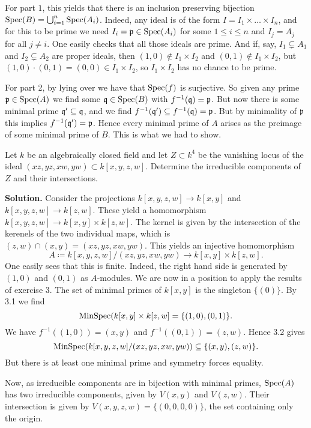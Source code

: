 \documentclass[a4paper,11pt]{article}
\begin{document}
For part $1$, this yields that there is an inclusion preserving bijection
$\operatorname{Spec}(B) = \bigcup_{i=1}^n \operatorname{Spec}(A_i)$. Indeed, any ideal is of the 
form $I = I_1 \times \dots \times I_n$, and for this to be prime we 
need $I_i = \mathfrak{p} \in \operatorname{Spec}(A_i)$ for some $1 \leq i \leq n$ and $I_j = A_j$ for
all $j \neq i$. One easily checks that  all those ideals are prime. And if,
say, $I_1 \subsetneq A_1$ and $I_2 \subsetneq A_2$ are proper ideals, then
$(1,0) \not \in I_1 \times I_2$ and $(0,1) \not \in I_1 \times I_2$, but $(1,0)
\cdot (0,1) = (0,0) \in I_1 \times I_2$, so $I_1 \times I_2$ has no chance to
be prime.

For part 2, by lying over we have that $\operatorname{Spec}(f)$ is surjective. So given 
any prime $\mathfrak{p} \in \operatorname{Spec}(A)$ we find some $\mathfrak{q} \in \operatorname{Spec}(B)$ with
$f^{-1}(\mathfrak{q}) = \mathfrak{p}$. But now there is some minimal prime $\mathfrak{q}' \subseteq \mathfrak{q}$,
and we find $f^{-1}(\mathfrak{q}') \subseteq f^{-1}(\mathfrak{q}) = \mathfrak{p}$. But by minimality of 
$\mathfrak{p}$ this implies $f^{-1}(\mathfrak{q}') = \mathfrak{p}$. Hence every minimal prime
of $A$ arises as the preimage of some minimal prime of $B$. This is what we 
had to show. 

Let $k$ be an algebraically closed field and let $Z \subset k^4$ be
the vanishing locus of the ideal
$(xz,yz,xw,yw) \subset k[x,y,z,w]$. Determine the irreducible components
of $Z$ and their intersections. 

\textbf{Solution.} Consider the projections $k[x,y,z,w] \to k[x,y]$ 
and $k[x,y,z,w] \to k[z,w]$. These yield a homomorphism $k[x,y,z,w] \to
k[x,y] \times k[z,w]$. The kernel is given by the intersection of the kerenels
of the two individual maps, which is $(z,w) \cap (x,y) = (xz,yz, xw, yw)$. 
This yields an injective homomorphism
$$A \coloneqq k[x,y,z,w]/(xz,yz,xw,yw) \to k[x,y] \times k[z,w].$$
One easily sees that this is finite. Indeed, the right hand side is generated
by $(1,0)$ and $(0,1)$ as $A$-modules. 
We are now in a position to apply the results of exercise 3. The set of minimal
primes of $k[x,y]$ is the singleton $\{(0)\}$. By 3.1 we find
\begin{equation*}
    \operatorname{MinSpec}(k[x,y] \times k[z,w] = \{(1,0), (0,1)\}.
\end{equation*}
We have $f^{-1}((1,0)) = (x,y)$ and $f^{-1}((0,1)) = (z,w)$. Hence 3.2 gives
\begin{equation*}
    \operatorname{MinSpec}(k[x,y,z,w]/(xz,yz,xw,yw)) \subseteq \{(x,y), (z,w)\}.
\end{equation*}
But there is at least one minimal prime and symmetry forces equality.

Now, as irreducible components are in bijection with minimal primes,
$\operatorname{Spec}(A)$ has two irreducible components, given by
$V(x,y)$ and $V(z,w)$. Their intersection is given by 
$V(x,y,z,w) = \{(0,0,0,0)\}$, the set containing only the origin.



\contactend
\end{document}
